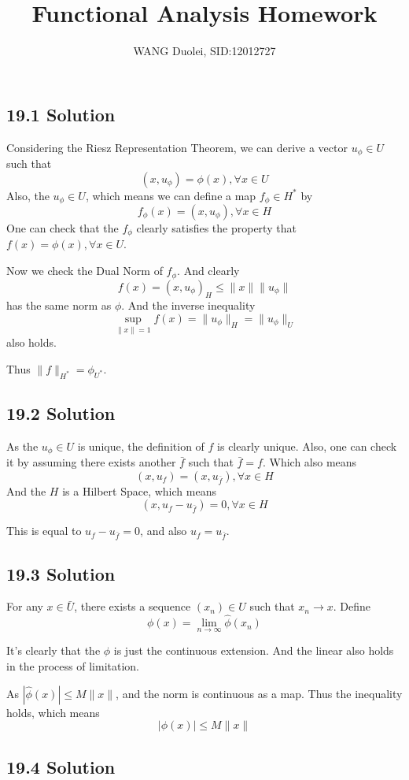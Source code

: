 \documentclass{article}
\title{Functional Analysis Homework}
\author{WANG Duolei, SID:12012727}
\affil{wangdl2020@mail.sustech.edu.cn}
\date{}
\begin{document}
\maketitle
\subsection*{19.1 Solution}
Considering the Riesz Representation Theorem, we can derive a vector \(u_{\phi} \in U \) such that
\[(x, u_\phi) = \phi(x), \forall x \in U\]
Also, the \(u_\phi \in U\), which means we can define a map \(f_{\phi} \in H^*\) by 
\[f_{\phi}(x) = (x, u_\phi), \forall x \in H\]
One can check that the \(f_\phi\) clearly satisfies the property that \(f(x) = \phi(x), \forall x \in U\).

Now we check the Dual Norm of \(f_\phi\). And clearly
\[f(x) = (x, u_{\phi})_{H} \le \|x\| \|u_\phi\|\]
has the same norm as \(\phi\). And the inverse inequality 
\[\sup_{\|x\| = 1} f(x) = \|u_\phi\|_H = \|u_\phi\|_U\]
also holds.

Thus \(\|f\|_{H^*} = \phi_{U^*}\).

\subsection*{19.2 Solution}

As the \(u_\phi \in U\) is unique, the definition of \(f\) is clearly unique. Also, one can check it by assuming there exists another \(\bar f\) such that \(\bar f = f\). Which also means
\[(x, u_f) = (x, u_{\bar f}), \forall x \in H\]
And the \(H\) is a Hilbert Space, which means
\[(x, u_f - u_{\bar f}) = 0, \forall x \in H\]

This is equal to \(u_f - u_{\bar f} = 0\), and also \(u_f = u_{\bar f}\).


\subsection*{19.3 Solution}
For any \(x \in \bar U\), there exists a sequence \((x_n) \in U\) such that \(x_n \to x\). Define
\[\phi(x) = \lim_{n \to \infty} \hat \phi(x_n)\]

It's clearly that the \(\phi\) is just the continuous extension. And the linear also holds in the process of limitation.

As \(|\hat \phi(x)| \le M \|x\| \), and the norm is continuous as a map. Thus the inequality holds, which means 
\[|\phi(x)| \le M\|x\|\]

\subsection*{19.4 Solution}
\end{document}
